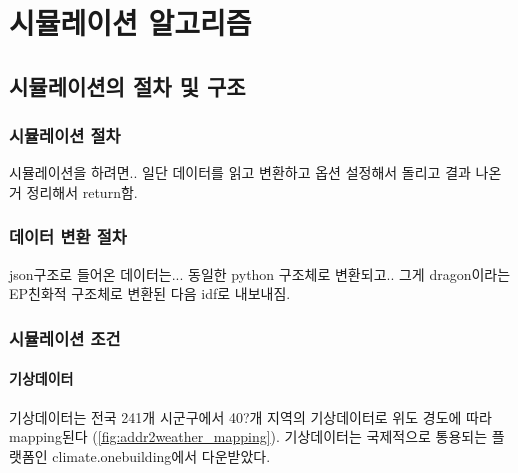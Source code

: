 \part{시뮬레이션 알고리즘}
\label{part:algorithm}


\chapter{시뮬레이션의 절차 및 구조}

\section{시뮬레이션 절차}
시뮬레이션을 하려면.. 일단 데이터를 읽고 변환하고 옵션 설정해서 돌리고 결과 나온거 정리해서 return함.


\section{데이터 변환 절차}
json구조로 들어온 데이터는... 동일한 python 구조체로 변환되고.. 그게 dragon이라는 EP친화적 구조체로 변환된 다음 idf로 내보내짐.


\section{시뮬레이션 조건}
\subsection{기상데이터}
기상데이터는 전국 241개 시군구에서 40?개 지역의 기상데이터로 위도 경도에 따라 mapping된다 (\ref{fig:addr2weather_mapping}). 기상데이터는 국제적으로 통용되는 플랫폼인 climate.onebuilding\cite{onebuilding2024}에서 다운받았다.

